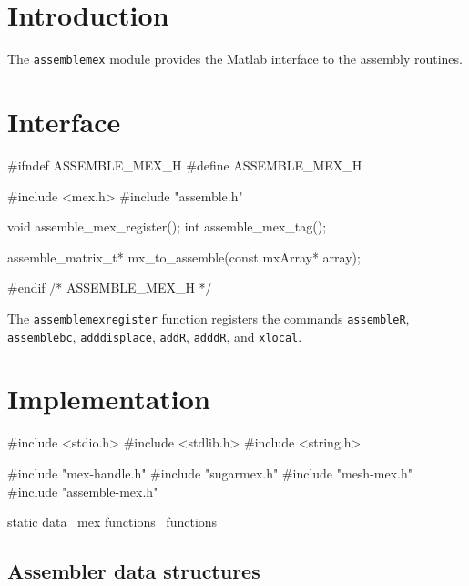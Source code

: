 
\section{Introduction}

The {\tt{}assemble{}mex} module provides the Matlab interface to
the assembly routines.


\section{Interface}

\endmoddef
#ifndef ASSEMBLE_MEX_H
#define ASSEMBLE_MEX_H

#include <mex.h>
#include "assemble.h"

void assemble_mex_register();
int  assemble_mex_tag();

assemble_matrix_t* mx_to_assemble(const mxArray* array);

#endif /* ASSEMBLE_MEX_H */
\nwendcode{}\nwdocspar

The {\tt{}assemble{}mex{}register} function registers the commands
{\tt{}assemble{}R}, {\tt{}assemble{}bc}, {\tt{}add{}displace}, {\tt{}add{}R},
{\tt{}add{}dR}, and {\tt{}x{}local}.


\section{Implementation}

\nwenddocs{}\endmoddef
#include <stdio.h>
#include <stdlib.h>
#include <string.h>

#include "mex-handle.h"
#include "sugarmex.h"
#include "mesh-mex.h"
#include "assemble-mex.h"

\LA{}static data~{\nwtagstyle{}}\RA{}
\LA{}mex functions~{\nwtagstyle{}}\RA{}
\LA{}functions~{\nwtagstyle{}}\RA{}
\nwendcode{}\nwdocspar


\subsection{Assembler data structures}

